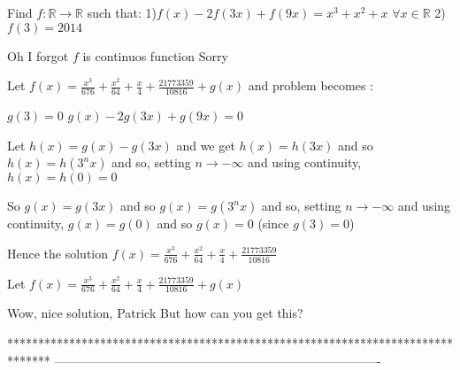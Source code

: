 \begin{solution}
	\begin{tcolorbox}Find $f:\mathbb{R}\rightarrow \mathbb{R}$ such that:
1)$f(x)-2f(3x)+f(9x)=x^3+x^2+x$ $\forall x\in \mathbb{R}$
2)$f(3)=2014$\end{tcolorbox}

\begin{tcolorbox}Oh I forgot
$f$ is continuos function
Sorry\end{tcolorbox}
Let $f(x)=\frac {x^3}{676}+\frac{x^2}{64}+\frac x4+\frac{21773359}{10816}+g(x)$ and problem becomes :

$g(3)=0$
$g(x)-2g(3x)+g(9x)=0$

Let $h(x)=g(x)-g(3x)$ and we get $h(x)=h(3x)$ and so $h(x)=h(3^nx)$ and so, setting $n\to -\infty$ and using continuity, $h(x)=h(0)=0$

So $g(x)=g(3x)$ and so $g(x)=g(3^nx)$ and so, setting $n\to -\infty$ and using continuity, $g(x)=g(0)$ and so $g(x)=0$ (since $g(3)=0$)

Hence the solution $\boxed{f(x)=\frac {x^3}{676}+\frac{x^2}{64}+\frac x4+\frac{21773359}{10816}}$
\end{solution}



\begin{solution}
	\begin{tcolorbox}
Let $f(x)=\frac {x^3}{676}+\frac{x^2}{64}+\frac x4+\frac{21773359}{10816}+g(x)$\end{tcolorbox}
Wow, nice solution, Patrick
But how can you get this?
\end{solution}



*******************************************************************************
-------------------------------------------------------------------------------


